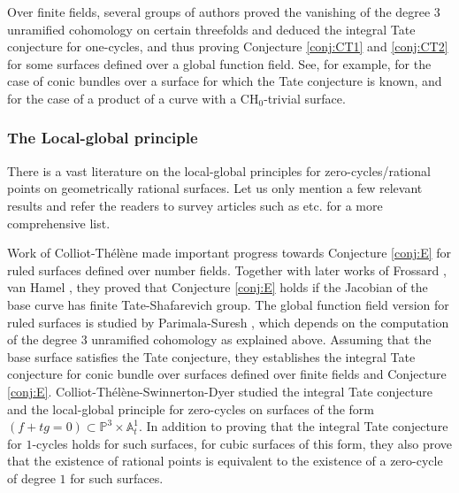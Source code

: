 \documentclass{amsart}
\theoremstyle{definition}
\theoremstyle{remark}
\newcommand{\mbb}{\mathbb}
\newcommand{\AAA}{\mbb{A}}
\newcommand{\PP}{\mbb{P}}
\begin{document}
Over finite fields, several groups of authors proved the vanishing of the degree $3$ unramified cohomology on certain threefolds and deduced the integral Tate conjecture for one-cycles, and thus proving Conjecture \ref{conj:CT1} and \ref{conj:CT2} for some surfaces defined over a global function field. See, for example, \cite{Parimala_Suresh_ruled} for the case of conic bundles over a surface for which the Tate conjecture is known, \cite{CT_Scavia_ITC} and \cite{Scavia_ITC} for the case of a product of a curve with a $\text{CH}_0$-trivial surface.

\subsubsection{The Local-global principle}
There is a vast literature on the local-global principles for zero-cycles/rational points on geometrically rational surfaces. Let us only mention a few relevant results and refer the readers to survey articles such as \cite{WittenbergRationalPointSurvey} etc. for a more comprehensive list.

Work of Colliot-Th\'el\`ene \cite{CT_zero_cycle_ruled} made important progress towards Conjecture \ref{conj:E} for ruled surfaces defined over number fields. Together with later works of Frossard \cite{Frossard}, van Hamel \cite{vanHamel_SB_curve}, they proved that Conjecture \ref{conj:E} holds  if the Jacobian of the base curve has finite Tate-Shafarevich group.
The global function field version for ruled surfaces is studied by Parimala-Suresh \cite{Parimala_Suresh_ruled}, which depends on the computation of the degree $3$ unramified cohomology as explained above. 
Assuming that the base surface satisfies the Tate conjecture, they establishes the integral Tate conjecture for conic bundle over surfaces defined over finite fields and Conjecture \ref{conj:E}.
Colliot-Th\'el\`ene-Swinnerton-Dyer \cite{CTSDPencil} studied the integral Tate conjecture and the local-global principle for zero-cycles on surfaces of the form $(f+tg=0)\subset \PP^3 \times \AAA^1_t$. In addition to proving that the integral Tate conjecture for $1$-cycles holds for such surfaces, for cubic surfaces of this form, they also prove that the existence of rational points is equivalent to the existence of a  zero-cycle of degree $1$ for such surfaces.
\end{document}
